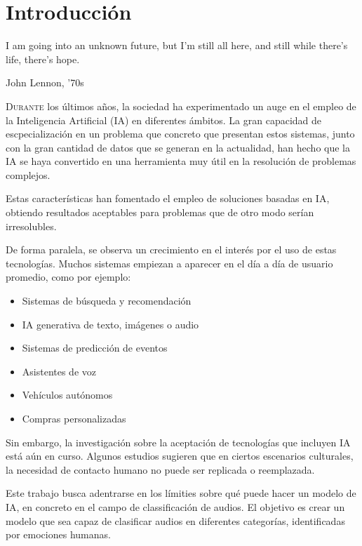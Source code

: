 \chapter{Introducción}\label{chp-01}
\epigraph{I am going into an unknown future, but I'm still all here, and still while there's life, there's hope.}{John Lennon, '70s}

\lettrine[lraise=-0.1, lines=2, loversize=0.2]{D}{urante} los últimos años, la sociedad ha experimentado un auge en el empleo de la Inteligencia Artificial (IA) en diferentes ámbitos. 
La gran capacidad de escpecialización en un problema que concreto que presentan estos sistemas, junto con la gran cantidad de datos que se generan en la actualidad, han hecho que la IA se haya convertido en una herramienta muy útil en la resolución de problemas complejos.

Estas características han fomentado el empleo de soluciones basadas en IA, obtiendo resultados aceptables para problemas que de otro modo serían irresolubles.

De forma paralela, se observa un crecimiento en el interés por el uso de estas tecnologías.
Muchos sistemas empiezan a aparecer en el día a día de usuario promedio, como por ejemplo: \cite{VIU_article}

\begin{itemize}\itemsep1pt \parskip0pt 
\item Sistemas de búsqueda y recomendación
\item IA generativa de texto, imágenes o audio
\item Sistemas de predicción de eventos
\item Asistentes de voz
\item Vehículos autónomos
\item Compras personalizadas
\end{itemize}

Sin embargo, la investigación sobre la aceptación de tecnologías que incluyen IA está aún en curso. 
Algunos estudios sugieren que en ciertos escenarios culturales, la necesidad de contacto humano no puede ser replicada o reemplazada. \cite{KELLY2023101925}

Este trabajo busca adentrarse en los límities sobre qué puede hacer un modelo de IA, en concreto en el campo de classificación de audios.
El objetivo es crear un modelo que sea capaz de clasificar audios en diferentes categorías, identificadas por emociones humanas. 

